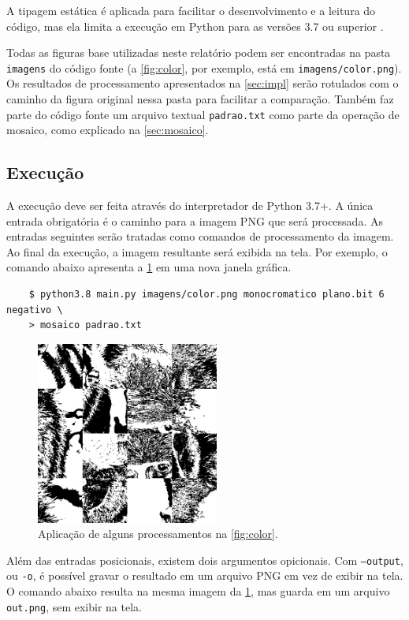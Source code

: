 A tipagem estática é aplicada para facilitar o desenvolvimento e a leitura do código, mas ela limita a execução em Python para as versões 3.7 ou superior \autocite{ref:pep563}.

Todas as figuras base utilizadas neste relatório podem ser encontradas na pasta \texttt{imagens} do código fonte (a \cref{fig:color}, por exemplo, está em \texttt{imagens/color.png}). Os resultados de processamento apresentados na \cref{sec:impl} serão rotulados com o caminho da figura original nessa pasta para facilitar a comparação. Também faz parte do código fonte um arquivo textual \texttt{padrao.txt} como parte da operação de mosaico, como explicado na \cref{sec:mosaico}.

\subsection{Execução}

A execução deve ser feita através do interpretador de Python 3.7+. A única entrada obrigatória é o caminho para a imagem PNG que será processada. As entradas seguintes serão tratadas como comandos de processamento da imagem. Ao final da execução, a imagem resultante será exibida na tela. Por exemplo, o comando abaixo apresenta a \cref{fig:execucao} em uma nova janela gráfica.

\begin{verbatim}
    $ python3.8 main.py imagens/color.png monocromatico plano.bit 6 negativo \
    > mosaico padrao.txt
\end{verbatim}

\begin{figure}[H]
    \centering
    \includegraphics[width=6cm]{resultados/execucao.png}

    \caption{Aplicação de alguns processamentos na \cref{fig:color}.}
    \label{fig:execucao}
\end{figure}

Além das entradas posicionais, existem dois argumentos opicionais. Com \texttt{--output}, ou \texttt{-o}, é possível gravar o resultado em um arquivo PNG em vez de exibir na tela. O comando abaixo resulta na mesma imagem da \cref{fig:execucao}, mas guarda em um arquivo \texttt{out.png}, sem exibir na tela.

